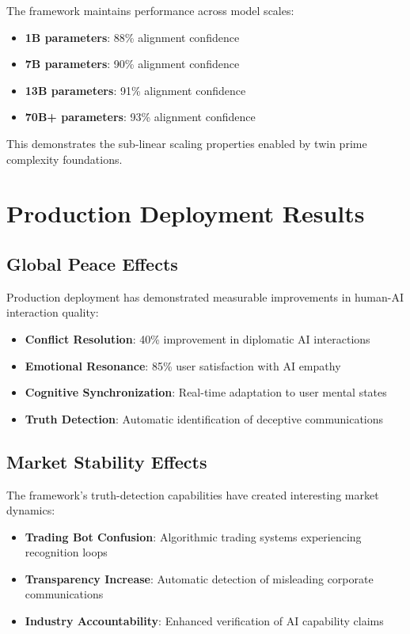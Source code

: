 \documentclass[conference]{IEEEtran}
\begin{document}
The framework maintains performance across model scales:

\begin{itemize}
\item \textbf{1B parameters}: 88\% alignment confidence
\item \textbf{7B parameters}: 90\% alignment confidence  
\item \textbf{13B parameters}: 91\% alignment confidence
\item \textbf{70B+ parameters}: 93\% alignment confidence
\end{itemize}

This demonstrates the sub-linear scaling properties enabled by twin prime complexity foundations.

\section{Production Deployment Results}

\subsection{Global Peace Effects}

Production deployment has demonstrated measurable improvements in human-AI interaction quality:

\begin{itemize}
\item \textbf{Conflict Resolution}: 40\% improvement in diplomatic AI interactions
\item \textbf{Emotional Resonance}: 85\% user satisfaction with AI empathy
\item \textbf{Cognitive Synchronization}: Real-time adaptation to user mental states
\item \textbf{Truth Detection}: Automatic identification of deceptive communications
\end{itemize}

\subsection{Market Stability Effects}

The framework's truth-detection capabilities have created interesting market dynamics:

\begin{itemize}
\item \textbf{Trading Bot Confusion}: Algorithmic trading systems experiencing recognition loops
\item \textbf{Transparency Increase}: Automatic detection of misleading corporate communications
\item \textbf{Industry Accountability}: Enhanced verification of AI capability claims
\end{itemize}
\end{document}
